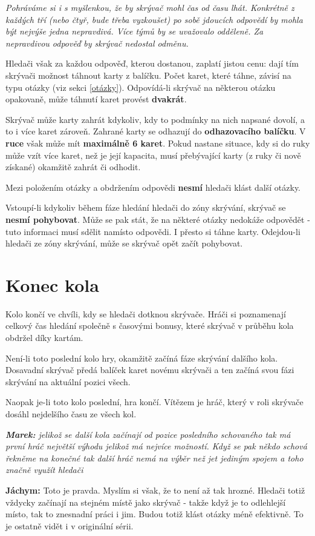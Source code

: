 \documentclass{book}
\newenvironment{reasoning}{\begin{small}\itshape}{\end{small}}
\begin{document}
\begin{reasoning}
	Pohráváme si i s myšlenkou, že by skrývač mohl čas od času lhát. Konkrétně z každých tří (nebo čtyř, bude třeba vyzkoušet) po sobě jdoucích odpovědí by mohla být nejvýše jedna nepravdivá. Více týmů by se uvažovalo odděleně. Za nepravdivou odpověď by skrývač nedostal odměnu.
\end{reasoning}

Hledači však za každou odpověď, kterou dostanou, zaplatí jistou cenu: dají tím skrývači možnost táhnout karty z balíčku. Počet karet, které táhne, závisí na typu otázky (viz sekci \ref{otázky}). Odpovídá-li skrývač na některou otázku opakovaně, může táhnutí karet provést \textbf{dvakrát}.

Skrývač může karty zahrát kdykoliv, kdy to podmínky na nich napsané dovolí, a to i více karet zároveň. Zahrané karty se odhazují do \textbf{odhazovacího balíčku}. V \textbf{ruce} však může mít \textbf{maximálně 6 karet}. Pokud nastane situace, kdy si do ruky může vzít více karet, než je její kapacita, musí přebývající karty (z ruky či nově získané) okamžitě zahrát či odhodit.

Mezi položením otázky a obdržením odpovědi \textbf{nesmí} hledači klást další otázky.

Vstoupí-li kdykoliv během fáze hledání hledači do zóny skrývání, skrývač se \textbf{nesmí pohybovat}. Může se pak stát, že na některé otázky nedokáže odpovědět - tuto informaci musí sdělit namísto odpovědi. I přesto si táhne karty. Odejdou-li hledači ze zóny skrývání, může se skrývač opět začít pohybovat.

\section{Konec kola}

Kolo končí ve chvíli, kdy se hledači dotknou skrývače. Hráči si poznamenají celkový čas hledání společně s časovými bonusy, které skrývač v průběhu kola obdržel díky kartám.

Není-li toto poslední kolo hry, okamžitě začíná fáze skrývání dalšího kola. Dosavadní skrývač předá balíček karet novému skrývači a ten začíná svou fázi skrývání na aktuální pozici všech.

Naopak je-li toto kolo poslední, hra končí. Vítězem je hráč, který v roli skrývače dosáhl nejdelšího času ze všech kol.

\begin{reasoning}
	\textbf{Marek:} jelikož se další kola začínají od pozice posledního schovaného tak má první hráč největší výhodu jelikož má nejvíce možností. Když se pak někdo schová řekněme na konečné tak další hráč nemá na výběr než jet jediným spojem a toho značně využít hledači

	\textbf{Jáchym:} Toto je pravda. Myslím si však, že to není až tak hrozné. Hledači totiž vždycky začínají na stejném místě jako skrývač - takže když je to odlehlejší místo, tak to znesnadní práci i jim. Budou totiž klást otázky méně efektivně. To je ostatně vidět i v originální sérii.
\end{reasoning}
\end{document}
